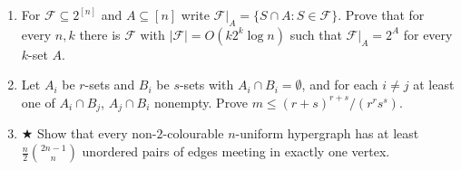 \begin{enumerate}[itemsep=4pt]
        every edge sees all four colours.
  \item For $\mathcal F\subseteq 2^{[n]}$ and $A\subseteq[n]$ write
        $\mathcal F|_A=\{S\cap A:S\in\mathcal F\}$. Prove that for every $n,k$
        there is $\mathcal F$ with $|\mathcal F|=O(k2^k\log n)$ such that
        $\mathcal F|_A=2^A$ for every $k$-set $A$.
  \item Let $A_i$ be $r$-sets and $B_i$ be $s$-sets with $A_i\cap B_i=\emptyset$,
        and for each $i\ne j$ at least one of $A_i\cap B_j$, $A_j\cap B_i$
        nonempty. Prove $m\le(r+s)^{r+s}/(r^r s^s)$.
  \item $\bigstar$ Show that every non-$2$-colourable $n$-uniform hypergraph has
        at least $\tfrac n2\binom{2n-1}{n}$ unordered pairs of edges meeting in
        exactly one vertex.
\end{enumerate}
